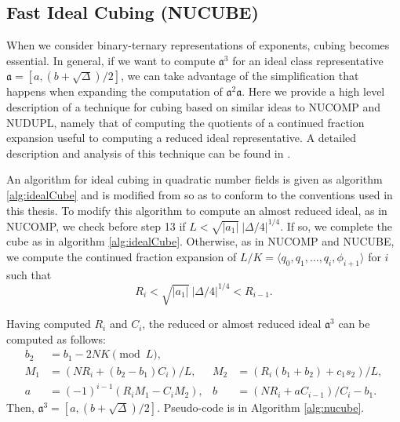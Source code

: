 \documentclass{ucalgthes1}
\theoremstyle{definition}
\begin{document}
\subsection{Fast Ideal Cubing (NUCUBE)}\label{subsec:nucube}

When we consider binary-ternary representations of exponents, cubing becomes essential.  In general, if we want to compute ${\mathfrak a}^3$ for an ideal class representative $\mathfrak a = [a, (b+\sqrt\Delta)/2]$, we can take advantage of the simplification that happens when expanding the computation of ${\mathfrak a}^2 \mathfrak a$.  Here we provide a high level description of a technique for cubing based on similar ideas to NUCOMP and NUDUPL, namely that of computing the quotients of a continued fraction expansion useful to computing a reduced ideal representative.  A detailed description and analysis of this technique can be found in \cite{Ijs2010}.

An algorithm for ideal cubing in quadratic number fields is given as algorithm \ref{alg:idealCube} and is modified from \cite[Appendix A, Algorithm 5]{Ijs2010} so as to conform to the conventions used in this thesis. To modify this algorithm to compute an almost reduced ideal, as in NUCOMP, we check before step 13 if $L < \sqrt{|a_1|} ~ |\Delta/4|^{1/4}$.  If so, we complete the cube as in algorithm \ref{alg:idealCube}.  Otherwise, as in NUCOMP and NUCUBE, we compute the continued fraction expansion of $L/K = \langle q_0, q_1, \dots, q_i, \phi_{i+1}\rangle$ for $i$ such that
\[
	R_i < \sqrt{|a_1|} ~ |\Delta/4|^{1/4} < R_{i-1}.
\]

\noindent
Having computed $R_i$ and $C_i$, the reduced or almost reduced ideal ${\mathfrak a}^3$ can be computed as follows:
\begin{align*}
	b_2 &= b_1 -2NK \pmod L, & \\
	M_1 &= (NR_i + (b_2-b_1)C_i)/L, &
	M_2 &= (R_i(b_1+b_2)+c_1s_2)/L, \\
	a &= (-1)^{i-1}(R_iM_1-C_iM_2), &
	b &= (NR_i + aC_{i-1})/C_i-b_1.
\end{align*}
Then, $\mathfrak a^3 = [a, (b+\sqrt\Delta)/2]$.  Pseudo-code is in Algorithm \ref{alg:nucube}.
\end{document}
